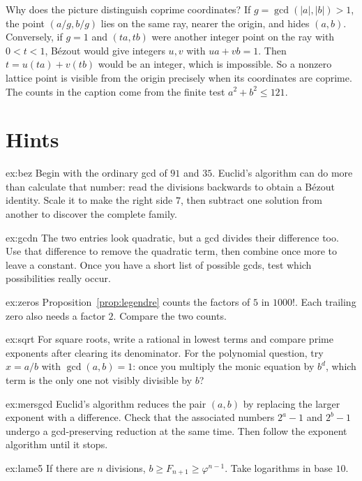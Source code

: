 Why does the picture distinguish coprime coordinates? If $g=\gcd(|a|,|b|)>1$, the point $(a/g,b/g)$ lies on the same ray, nearer the origin, and hides $(a,b)$. Conversely, if $g=1$ and $(ta,tb)$ were another integer point on the ray with $0<t<1$, B\'ezout would give integers $u,v$ with $ua+vb=1$. Then $t=u(ta)+v(tb)$ would be an integer, which is impossible. So a nonzero lattice point is visible from the origin precisely when its coordinates are coprime. The counts in the caption come from the finite test $a^2+b^2\le121$.

\section{Hints}

\begin{hint}{ex:bez}
Begin with the ordinary gcd of $91$ and $35$. Euclid's algorithm can do more than calculate that number: read the divisions backwards to obtain a B\'ezout identity. Scale it to make the right side $7$, then subtract one solution from another to discover the complete family.
\end{hint}
\begin{hint}{ex:gcdn}
The two entries look quadratic, but a gcd divides their difference too. Use that difference to remove the quadratic term, then combine once more to leave a constant. Once you have a short list of possible gcds, test which possibilities really occur.
\end{hint}
\begin{hint}{ex:zeros}
Proposition~\ref{prop:legendre} counts the factors of $5$ in $1000!$. Each trailing zero also needs a factor $2$. Compare the two counts.
\end{hint}
\begin{hint}{ex:sqrt}
For square roots, write a rational in lowest terms and compare prime exponents after clearing its denominator. For the polynomial question, try $x=a/b$ with $\gcd(a,b)=1$: once you multiply the monic equation by $b^d$, which term is the only one not visibly divisible by $b$?
\end{hint}
\begin{hint}{ex:mersgcd}
Euclid's algorithm reduces the pair $(a,b)$ by replacing the larger exponent with a difference. Check that the associated numbers $2^a-1$ and $2^b-1$ undergo a gcd-preserving reduction at the same time. Then follow the exponent algorithm until it stops.
\end{hint}
\begin{hint}{ex:lame5}
If there are $n$ divisions, $b\ge F_{n+1}\ge\varphi^{n-1}$. Take logarithms in base $10$.
\end{hint}
